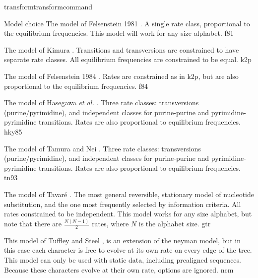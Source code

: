 \begin{command}{transform}{transformcommand}
\begin{arguments}
\begin {argumentgroup} {Model choice}
                {The model of Felsenstein 1981 \cite{felsenstein1981}. A
                single rate class, proportional to the equilibrium
                frequencies. This model will work for any size
                alphabet.}
                {f81}

                {The model of Kimura \cite{kimura1980}. Transitions and
                transversions are constrained to have separate rate
                classes. All equilibrium frequencies are constrained to be
                equal.}
                {k2p}

                {The model of Felsenstein 1984 \cite{felsenstein1980}. Rates
                are constrained as in k2p, but are also proportional to
                the equilibrium frequencies.}
                {f84}

                {The model of Hasegawa \emph{et al.} \cite{hasegawa1984}. 
                Three rate classes:
                transversions (purine/pyrimidine), and independent
                classes for purine-purine and pyrimidine-pyrimidine
                transitions. Rates are also proportional to equilibrium
                frequencies.}
                {hky85}

                {The model of Tamura and Nei \cite{tamura1993}. Three
                rate classes: transversions (purine/pyrimidine), and
                independent classes for purine-purine and
                pyrimidine-pyrimidine transitions. Rates are also
                proportional to equilibrium frequencies.}
                {tn93}

                {The model of Tavar\'{e} \cite{tavare1986}. The most general
                reversible, stationary model of nucleotide substitution,
                and the one most frequently selected by information
                criteria. All rates constrained to be independent. This
                model works for any size alphabet, but note that there
                are $\frac{N (N-1)}{2}$ rates, where $N$ is the alphabet
                size.}
                {gtr}
    
                {This model of Tuffley and Steel \cite{tuffleyandsteel1998}, is an 
                extension of the neyman model, but in this case each character is 
                free to evolve at its own rate on every edge of the tree. This 
                model can only be used with static data, including prealigned sequences.  
                Because these characters evolve at their own rate,  
                options are ignored.}
                {ncm}
                    

\end{argumentgroup}
\end{arguments}
\end{command}
